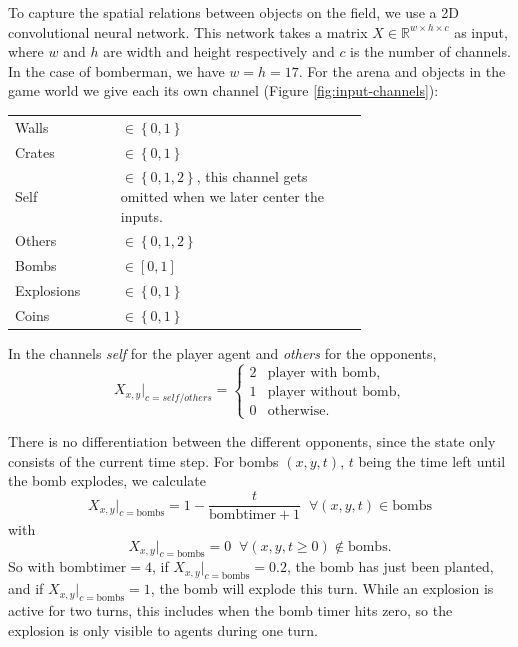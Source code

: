 

To capture the spatial relations between objects on the field, we use a 2D convolutional neural network. This network takes a matrix $X\in\mathbb{R}^{w\times h \times c} $ as input, where $w$ and $h$ are width and height respectively and $c$ is the number of channels. In the case of bomberman, we have $w=h=17$. For the arena and objects in the game world we give each its own channel (Figure \ref{fig:input-channels}):

\begin{tabular}{l p{0.7\linewidth}}
Walls & $\in\left\{0,1\right\}$ \\
Crates & $\in\left\{0,1\right\}$ \\
Self & $\in\left\{0,1,2\right\}$, this channel gets omitted when we later center the inputs. \\
Others & $\in\left\{0,1,2\right\}$\\
Bombs & $\in\left[0, 1\right]$ \\
Explosions & $\in\left\{0,1\right\}$ \\
Coins& $\in\left\{0,1\right\}$ \\
\end{tabular}

In the channels \emph{self} for the player agent and \emph{others} for the opponents,
$$X_{x,y}|_{c=self/others}=\begin{cases}
2 & \text{player with bomb,} \\
1 & \text{player without bomb,} \\
0 & \text{otherwise.}
\end{cases}
$$

There is no differentiation between the different opponents, since the state only consists of the current time step.
For bombs $(x, y, t)$, $t$ being the time left until the bomb explodes, we calculate $$X_{x, y}|_{c=\text{bombs}} = 1 - \frac{t}{\mathrm{bombtimer}+1} \;\;\forall (x, y, t) \in \text{bombs}$$ with $$X_{x, y}|_{c=\text{bombs}}=0 \;\;\forall (x, y, t\geq0) \notin \text{bombs}.$$
So with $\text{bombtimer}=4$, if $X_{x, y}|_{c=\text{bombs}} = 0.2$, the bomb has just been planted, and if $X_{x, y}|_{c=\text{bombs}} = 1$, the bomb will explode this turn.
While an explosion is active for two turns, this includes when the bomb timer hits zero, so the explosion is only visible to agents during one turn.


